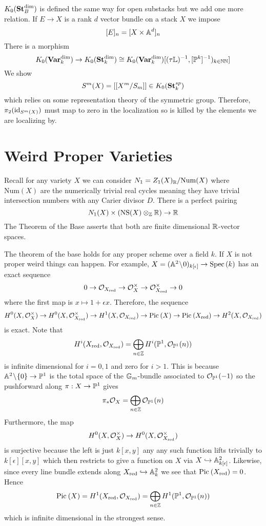 \documentclass[12pt]{article}
\newcommand{\LL}{\mathbb{L}}
\begin{document}
$K_0(\St_B^{\dim})$ is defined the same way for open substacks but we add one more relation. If $E \to X$ is a rank $d$ vector bundle on a stack $X$ we impose
\[ [E]_n = [X \times \A^d]_n \]
There is a morphism
\[ K_0(\Var_k^{\dim}) \to K_0(\St_k^{\dim}) \cong K_0(\Var_k^{\dim})[(\tau \LL)^{-1}, [\PP^k]^{-1})_{k \in \NN}] \]
We show
\[ S^m(X) = [ [X^m / S_m] ] \in K_0(\St^{sp}_k) \]
which relies on some representation theory of the symmetric group. Therefore, $\pi_2(\id_{S^m(X)})$ must map to zero in the localization so is killed by the elements we are localizing by.


\section{Weird Proper Varieties}

\begin{defn}
Recall for any variety $X$ we can consider $N_1 = Z_1(X)_{\RR} / \mathrm{Num}(X)$ where $\mathrm{Num}(X)$ are the numerically trivial real cycles meaning they have trivial intersection numbers with any Carier divisor $D$. There is a perfect pairing 
\[ N_1(X) \times (\NS(X) \ot_{\ZZ} \RR) \to \RR \]
The Theorem of the Base asserts that both are finite dimensional $\RR$-vector spaces. 
\end{defn}

\begin{rmk}
The theorem of the base holds for any proper scheme over a field $k$. If $X$ is not proper weird things can happen. For example, $X = (\A^2 \sm 0)_{k[\epsilon]} \to \Spec{k}$ has an exact sequence
\[ 0 \to \struct{X_{\red}} \to \struct{X}^\times \to \struct{X_{\red}}^\times \to 0 \]
where the first map is $x \mapsto 1 + \epsilon x$. Therefore, the sequence
\[ H^0(X, \struct{X}^\times) \to H^0(X, \struct{X_{\red}}^\times) \to H^1(X, \struct{X_{\red}}) \to \Pic{X} \to \Pic{X_{\red}} \to H^2(X, \struct{X_{\red}}) \]
is exact. Note that
\[ H^i(X_{\red}, \struct{X_{\red}}) = \bigoplus_{n \in \ZZ} H^i(\P^1, \struct{\P^1}(n)) \]
is infinite dimensional for $i = 0,1$ and zero for $i > 1$. This is because $\A^2 \sm \{ 0 \} \to \P^1$ is the total space of the $\Gm$-bundle associated to $\struct{\P^1}(-1)$ so the pushforward along $\pi : X \to \P^1$ gives
\[ \pi_* \struct{X} = \bigoplus_{n \in \ZZ} \struct{\P^1}(n) \] 
Furthermore, the map 
\[ H^0(X, \struct{X}^\times) \to H^0(X, \struct{X_{\red}}^\times) \]
is surjective because the left is just $k[x,y]$ any any such function lifts trivially to $k[\epsilon][x,y]$ which then restricts to give a function on $X$ via $X \embed \A^2_{k[\epsilon]}$. Likewise, since every line bundle extends along $X_{\red} \embed \A^2_k$ we see that $\Pic{X_{\red}} = 0$. Hence
\[ \Pic{X} = H^1(X_{\red}, \struct{X_{\red}}) = \bigoplus_{n \in \ZZ} H^1(\P^1, \struct{\P^1}(n)) \]
which is infinite dimensional in the strongest sense. 
\end{rmk}
\end{document}
